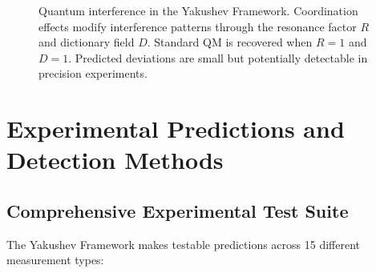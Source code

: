 \documentclass[11pt,a4paper]{article}
\begin{document}
\begin{figure}[htbp]
{
		}
		\caption{Quantum interference in the Yakushev Framework. Coordination effects modify interference patterns through the resonance factor $R$ and dictionary field $D$. Standard QM is recovered when $R=1$ and $D=1$. Predicted deviations are small but potentially detectable in precision experiments.}
		\label{fig:quantum-interference}
	\end{figure}
	
	\section{Experimental Predictions and Detection Methods}
	\subsection{Comprehensive Experimental Test Suite}
	
	The Yakushev Framework makes testable predictions across 15 different measurement types:
	
\end{document}
